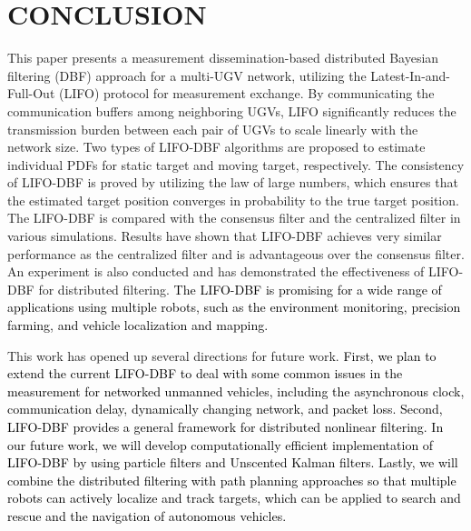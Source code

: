 \documentclass[journal]{IEEEtranTIE}
\theoremstyle{remark}
\begin{document}
	\section{CONCLUSION}\label{sec:conclu}
	This paper presents a measurement dissemination-based distributed Bayesian filtering (DBF) approach for a multi-UGV network, utilizing the Latest-In-and-Full-Out (LIFO) protocol for measurement exchange.
	By communicating the communication buffers among neighboring UGVs, LIFO significantly reduces the transmission burden between each pair of UGVs to scale linearly with the network size.
	Two types of LIFO-DBF algorithms are proposed to estimate individual PDFs for static target and moving target, respectively.
	The consistency of LIFO-DBF is proved by utilizing the law of large numbers, which ensures that the estimated target position converges in probability to the true target position.
	The LIFO-DBF is compared with the consensus filter and the centralized filter in various simulations.
	Results have shown that LIFO-DBF achieves very similar performance as the centralized filter and is advantageous over the consensus filter.
	An experiment is also conducted and has demonstrated the effectiveness of LIFO-DBF for distributed filtering.
	\textcolor{black}{The LIFO-DBF is promising for a wide range of applications using multiple robots, such as the environment monitoring, precision farming, and vehicle localization and mapping.}
	
	This work has opened up several directions for future work.
	\textcolor{black}{First, we plan to extend the current LIFO-DBF to deal with some common issues in the measurement for networked unmanned vehicles, including the asynchronous clock, communication delay, dynamically changing network, and packet loss.
		Second, LIFO-DBF provides a general framework for distributed nonlinear filtering. 
		In our future work, we will develop computationally efficient implementation of LIFO-DBF by using particle filters and Unscented Kalman filters.
		Lastly, we will combine the distributed filtering with path planning approaches \cite{liu2015model} so that multiple robots can actively localize and track targets, which can be applied to search and rescue and the navigation of autonomous vehicles.}
	
	\addtolength{\textheight}{0cm}   %
	
\end{document}
